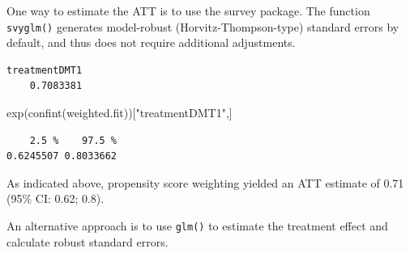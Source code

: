 \documentclass[
  letterpaper,
  DIV=11,
  numbers=noendperiod]{scrreprt}
\newenvironment{Shaded}{\begin{snugshade}}{\end{snugshade}}
\newcommand{\AttributeTok}[1]{\textcolor[rgb]{0.40,0.45,0.13}{#1}}
\newcommand{\DecValTok}[1]{\textcolor[rgb]{0.68,0.00,0.00}{#1}}
\newcommand{\FunctionTok}[1]{\textcolor[rgb]{0.28,0.35,0.67}{#1}}
\newcommand{\NormalTok}[1]{\textcolor[rgb]{0.00,0.23,0.31}{#1}}
\newcommand{\OtherTok}[1]{\textcolor[rgb]{0.00,0.23,0.31}{#1}}
\newcommand{\SpecialCharTok}[1]{\textcolor[rgb]{0.37,0.37,0.37}{#1}}
\newcommand{\StringTok}[1]{\textcolor[rgb]{0.13,0.47,0.30}{#1}}
\begin{document}
One way to estimate the ATT is to use the survey package. The function
\texttt{svyglm()} generates model-robust (Horvitz-Thompson-type)
standard errors by default, and thus does not require additional
adjustments.

\begin{Shaded}
\end{Shaded}

\begin{verbatim}
treatmentDMT1 
    0.7083381 
\end{verbatim}

\begin{Shaded}
\begin{Highlighting}[]
\FunctionTok{exp}\NormalTok{(}\FunctionTok{confint}\NormalTok{(weighted.fit))[}\StringTok{"treatmentDMT1"}\NormalTok{,] }
\end{Highlighting}
\end{Shaded}

\begin{verbatim}
    2.5 %    97.5 % 
0.6245507 0.8033662 
\end{verbatim}

As indicated above, propensity score weighting yielded an ATT estimate
of 0.71 (95\% CI: 0.62; 0.8).

An alternative approach is to use \texttt{glm()} to estimate the
treatment effect and calculate robust standard errors.
\end{document}
